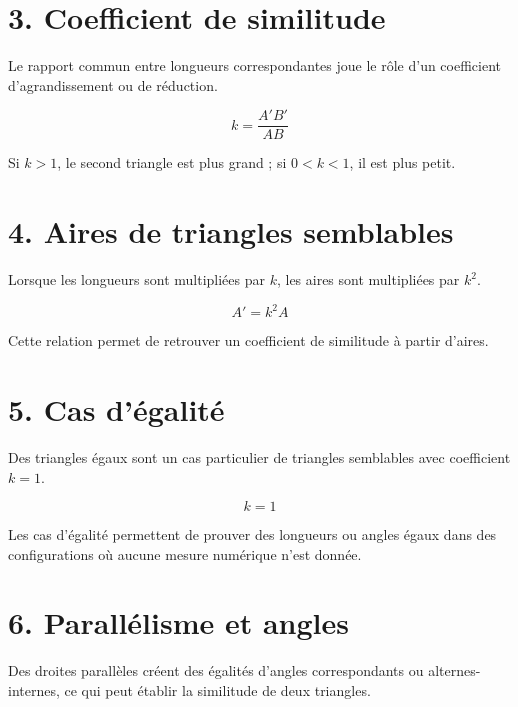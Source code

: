 
\section{3. Coefficient de similitude}
Le rapport commun entre longueurs correspondantes joue le rôle d’un coefficient d’agrandissement ou de réduction.

\[
k=\dfrac{A'B'}{AB}
\]

\begin{exemple}
Si $k>1$, le second triangle est plus grand ; si $0<k<1$, il est plus petit.
\end{exemple}

\section{4. Aires de triangles semblables}
Lorsque les longueurs sont multipliées par $k$, les aires sont multipliées par $k^2$.

\[
A'=k^2A
\]

\begin{exemple}
Cette relation permet de retrouver un coefficient de similitude à partir d’aires.
\end{exemple}

\section{5. Cas d’égalité}
Des triangles égaux sont un cas particulier de triangles semblables avec coefficient $k=1$.

\[
k=1
\]

\begin{exemple}
Les cas d’égalité permettent de prouver des longueurs ou angles égaux dans des configurations où aucune mesure numérique n’est donnée.
\end{exemple}


\section{6. Parallélisme et angles}
Des droites parallèles créent des égalités d’angles correspondants ou alternes-internes, ce qui peut établir la similitude de deux triangles.

